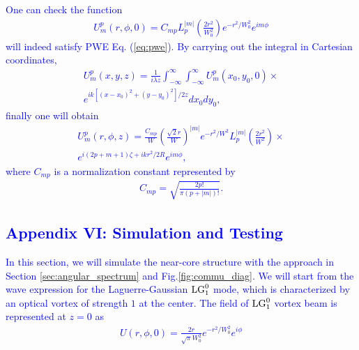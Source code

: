 \textcolor{blue}{
One can check the function
\begin{eqnarray}
	U_{m}^{p}(r, \phi, 0) = C_{mp} L^{|m|}_{p}\left( \frac{2r^2}{W_0^2} \right)
		e^{-r^2/W_0^2} e^{i m \phi}
\end{eqnarray}
will indeed satisfy PWE Eq. (\ref{eq:pwe}). By carrying out the integral in Cartesian coordinates,
\begin{eqnarray}
	U_{m}^{p}(x, y, z) = \frac{1}{i \lambda z} \int_{-\infty}^{\infty} \int_{-\infty}^{\infty}
		U_{m}^{p}(x_0, y_0, 0) \times
	\nonumber\\
	e^{ik[(x - x_0)^2 + (y - y_0)^2]/2z} dx_0 dy_0,
\end{eqnarray}
finally one will obtain
\begin{eqnarray}
	U_{m}^{p}(r, \phi, z) = \frac{C_{mp}}{W} \left(\frac{\sqrt{2} r}{W}\right)^{|m|}
		e^{-r^2/W^2} L^{|m|}_{p}\left( \frac{2r^2}{W^2} \right) \times
	\nonumber\\
	e^{i(2p + m + 1)\zeta + i kr^2/2R} e^{im\phi},
\end{eqnarray}
where $C_{mp}$ is a normalization constant represented by
\begin{eqnarray}
	C_{mp} = \sqrt{\frac{2p!}{\pi (p + |m|)!}}.
\end{eqnarray}}

\textcolor{blue}{
\section*{Appendix VI: Simulation and Testing}
In this section, we will simulate the near-core structure with the approach in Section \ref{sec:angular_spectrum}
and Fig.\ref{fig:commu_diag}. 
We will start from the wave expression for the Laguerre-Gaussian ${\rm LG}^{0}_{1}$ mode, which is characterized by an optical vortex of strength $1$ at the center.
The field of ${\rm LG}^{0}_{1}$ vortex beam is represented at $z = 0$ as
\begin{eqnarray}
U(r, \phi, 0) = \frac{2r}{\sqrt{\pi} W_0^2} e^{-r^2/W_0^2} e^{i\phi} 
\end{eqnarray}
}

